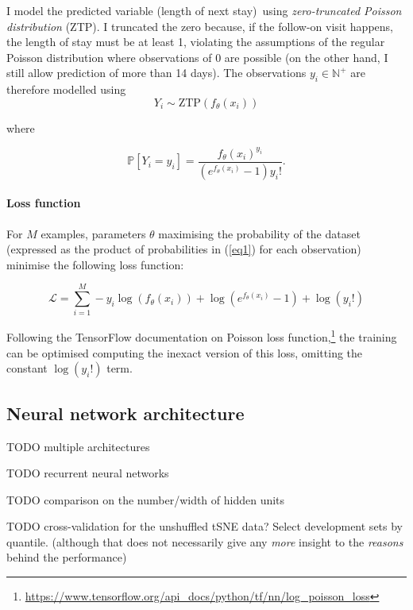 \documentclass[10pt, twocolumn]{article}
\begin{document}
I model the predicted variable (length of next stay) using \textit{zero-truncated Poisson distribution} (ZTP). I truncated the zero because, if the follow-on visit happens, the length of stay must be at least 1, violating the assumptions of the regular Poisson distribution where observations of 0 are possible (on the other hand, I still allow prediction of more than 14 days). The observations $y_i \in \mathbb{N}^+$ are therefore modelled using \[Y_i \sim \mathrm{ZTP}(f_\theta(x_i))\]

where 

\begin{equation}
	\mathbb{P}[Y_i = y_i] = \frac{f_\theta(x_i)^{y_i}}{(e^{f_\theta(x_i)} - 1)y_i!}.
	\label{eq1}
\end{equation}

\paragraph{Loss function} For $M$ examples, parameters $\theta$ maximising the probability of the dataset (expressed as the product of probabilities in (\ref{eq1}) for each observation) minimise the following loss function:

\begin{equation}
	\mathcal{L} = \sum\limits_{i=1}^{M} -y_i \log(f_\theta(x_i)) + \log(e^{f_\theta(x_i)} - 1) + \log(y_i!)
\end{equation}

Following the TensorFlow documentation on Poisson loss function,\footnote{\url{https://www.tensorflow.org/api_docs/python/tf/nn/log_poisson_loss}} the training can be optimised computing the inexact version of this loss, omitting the constant $\log(y_i!)$ term.


\subsection{Neural network architecture}
TODO multiple architectures

TODO recurrent neural networks

TODO comparison on the number/width of hidden units 

TODO cross-validation for the unshuffled tSNE data? Select development sets by quantile. (although that does not necessarily give any \textit{more} insight to the \textit{reasons} behind the performance)

\end{document}
